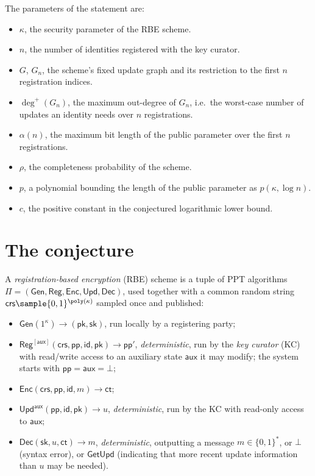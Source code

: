 \documentclass{conjura-conjecture}
\newcommand{\Gen}{\mathsf{Gen}}
\newcommand{\Reg}{\mathsf{Reg}}
\newcommand{\Enc}{\mathsf{Enc}}
\newcommand{\Upd}{\mathsf{Upd}}
\newcommand{\Dec}{\mathsf{Dec}}
\newcommand{\pp}{\mathsf{pp}}
\newcommand{\aux}{\mathsf{aux}}
\newcommand{\crs}{\mathsf{crs}}
\newcommand{\pk}{\mathsf{pk}}
\newcommand{\sk}{\mathsf{sk}}
\newcommand{\id}{\mathsf{id}}
\newcommand{\ct}{\mathsf{ct}}
\newcommand{\GetUpd}{\mathsf{GetUpd}}
\newcommand{\outdeg}{\deg^{+}}
\begin{document}
\medskip
\noindent The parameters of the statement are:
\begin{itemize}
\item $\kappa$, the security parameter of the RBE scheme.
\item $n$, the number of identities registered with the key curator.
\item $G$, $G_n$, the scheme's fixed update graph and its restriction to
  the first $n$ registration indices.
\item $\outdeg(G_n)$, the maximum out-degree of $G_n$, i.e.\ the
  worst-case number of updates an identity needs over $n$
  registrations.
\item $\alpha(n)$, the maximum bit length of the public parameter over
  the first $n$ registrations.
\item $\rho$, the completeness probability of the scheme.
\item $p$, a polynomial bounding the length of the public parameter as
  $p(\kappa,\log n)$.
\item $c$, the positive constant in the conjectured logarithmic lower
  bound.
\end{itemize}

\section{The conjecture}\label{sec:conjectures}

\begin{definition}\label{def:rbe2}
A \emph{registration-based encryption} (RBE) scheme is a tuple of PPT
algorithms $\Pi = (\Gen, \Reg, \Enc, \Upd, \Dec)$, used together with a
common random string $\crs \sample \{0,1\}^{\poly(\kappa)}$ sampled once
and published:
\begin{itemize}
  \item $\Gen(1^{\kappa}) \to (\pk,\sk)$, run locally by a registering
    party;
  \item $\Reg^{[\aux]}(\crs,\pp,\id,\pk) \to \pp'$,
    \emph{deterministic}, run by the \emph{key curator} (KC) with
    read/write access to an auxiliary state $\aux$ it may modify; the
    system starts with $\pp = \aux = \bot$;
  \item $\Enc(\crs,\pp,\id,m) \to \ct$;
  \item $\Upd^{\aux}(\pp,\id,\pk) \to u$, \emph{deterministic}, run by
    the KC with read-only access to $\aux$;
  \item $\Dec(\sk,u,\ct) \to m$, \emph{deterministic}, outputting a
    message $m \in \{0,1\}^{*}$, or $\bot$ (syntax error), or $\GetUpd$
    (indicating that more recent update information than $u$ may be
    needed).
\end{itemize}
\end{definition}
\end{document}
